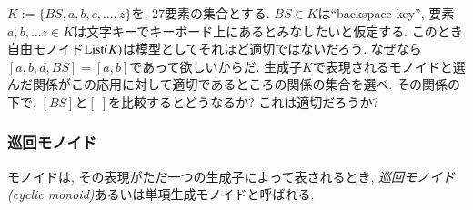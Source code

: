 \begin{exercise}
$K:=\{\mathit{BS},a,b,c,\ldots,z\}$を, 27要素の集合とする. $\mathit{BS}\in K$は``backspace key'', 要素$a,b,\ldots z\in K$は文字キーでキーボード上にあるとみなしたいと仮定する. このとき自由モノイド$\List(K)$は模型としてそれほど適切ではないだろう. なぜなら$[a,b,d,\mathit{BS}]=[a,b]$であって欲しいからだ.
\sexc 生成子$K$で表現されるモノイドと選んだ関係がこの応用に対して適切であるところの関係の集合を選べ. 
\next その関係の下で, $[\mathit{BS}]$と$[\;]$を比較するとどうなるか? これは適切だろうか?
\endsexc
\end{exercise}


\subsubsection{巡回モノイド}

\begin{definition}


モノイドは, その表現がただ一つの生成子によって表されるとき, \emph{巡回モノイド(cyclic monoid)}あるいは単項生成モノイドと呼ばれる.

\end{definition}

